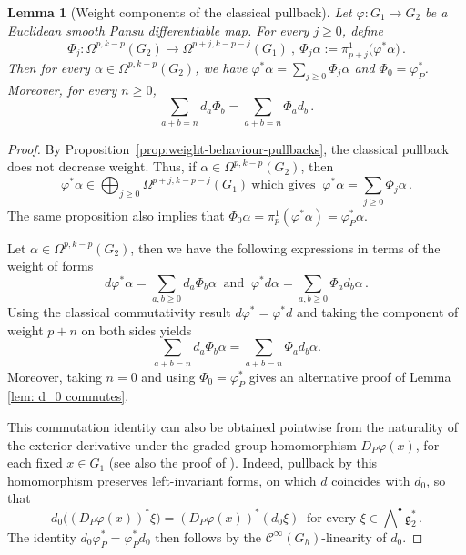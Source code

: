 \documentclass[dvipsnames]{amsart}
\newtheorem{lemma}[theorem]{Lemma}
\theoremstyle{definition}
\theoremstyle{definition}
\numberwithin{equation}{section}
\newcommand{\C}{\mathcal{C}}
\begin{document}
\begin{lemma}[Weight components of the classical pullback]
\label{lem:weight-components-classical-pullback}
Let \(\varphi:G_1\to G_2\) be a Euclidean smooth Pansu
differentiable map. For every \(j\geq0\), define
\[
\Phi_j:\Omega^{p,k-p}(G_2)
\longrightarrow
\Omega^{p+j,k-p-j}(G_1)\ ,\ 
\Phi_j\alpha
:=
\pi_{p+j}^1\bigl(\varphi^*\alpha\bigr)\,.
\]
Then for every $\alpha\in\Omega^{p,k-p}(G_2)$, we have $\varphi^*\alpha=\sum_{j\geq0}\Phi_j\alpha$ and $\Phi_0=\varphi_P^*$.
Moreover, for every \(n\geq0\),
\begin{equation}
\label{eq:components-filtered-chain-map}
\sum_{a+b=n}d_a\Phi_b
=
\sum_{a+b=n}\Phi_a d_b\,.
\end{equation}
\end{lemma}

\begin{proof}
By Proposition~\ref{prop:weight-behaviour-pullbacks}, the classical
pullback does not decrease weight. Thus, if
\(\alpha\in\Omega^{p,k-p}(G_2)\), then
\[
\varphi^*\alpha
\in
\bigoplus_{j\geq0}\Omega^{p+j,k-p-j}(G_1)\ \text{
which gives }
\
\varphi^*\alpha=\sum_{j\geq0}\Phi_j\alpha\,.
\]
The same proposition also implies that $
\Phi_0\alpha
=
\pi_p^1(\varphi^*\alpha)
=
\varphi_P^*\alpha$.


Let \(\alpha\in\Omega^{p,k-p}(G_2)\), then we have the following expressions in terms of the weight of forms
\[
d\varphi^*\alpha
=
\sum_{a,b\geq0}d_a\Phi_b\alpha\ \text{ and }\
\varphi^*d\alpha
=
\sum_{a,b\geq0}\Phi_a d_b\alpha\,.
\]
Using the classical commutativity result $d\varphi^\ast=\varphi^\ast d$ and taking the component of weight \(p+n\) on both sides yields
\[
\sum_{a+b=n}d_a\Phi_b\alpha
=
\sum_{a+b=n}\Phi_a d_b\alpha.
\]
Moreover, taking \(n=0\)
and using \(\Phi_0=\varphi_P^*\) gives an alternative proof of Lemma \ref{lem: d_0 commutes}.

This commutation identity can also be obtained pointwise
from the naturality of the exterior derivative under the
graded group homomorphism $D_P\varphi(x)$, for each fixed
$x\in G_1$ (see also the proof of
\cite[Lemma 4.8]{kleiner2020pansu}). Indeed, pullback by this homomorphism preserves
left-invariant forms, on which $d$ coincides with $d_0$, so that
$$d_0\bigl((D_P\varphi(x))^*\xi\bigr)
=
(D_P\varphi(x))^*(d_0\xi)\ \text{ for every }\xi\in\bigwedge\nolimits^\bullet\mathfrak g_2^\ast\,.$$
The identity $d_0\varphi_P^*=\varphi_P^*d_0$ then follows
by the $\C^\infty(G_h)$-linearity of $d_0$.
\end{proof}
\end{document}
